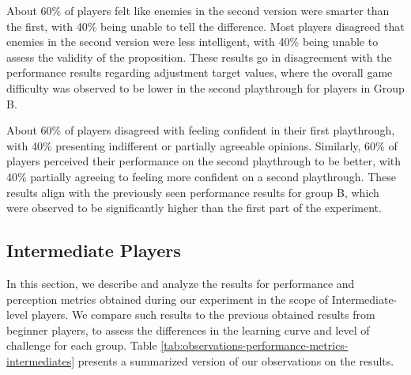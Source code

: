 About 60\% of players felt like enemies in the second version were smarter than the first, with 40\% being unable to tell the difference. Most players disagreed that enemies in the second version were less intelligent, with 40\% being unable to assess the validity of the proposition. These results go in disagreement with the performance results regarding adjustment target values, where the overall game difficulty was observed to be lower in the second playthrough for players in Group B.

About 60\% of players disagreed with feeling confident in their first playthrough, with 40\% presenting indifferent or partially agreeable opinions. Similarly, 60\% of players perceived their performance on the second playthrough to be better, with 40\% partially agreeing to feeling more confident on a second playthrough. These results align with the previously seen performance results for group B, which were observed to be significantly higher than the first part of the experiment.


\subsection{Intermediate Players}

In this section, we describe and analyze the results for performance and perception metrics obtained during our experiment in the scope of Intermediate-level players. We compare such results to the previous obtained results from beginner players, to assess the differences in the learning curve and level of challenge for each group. Table \ref{tab:observations-performance-metrics-intermediates} presents a summarized version of our observations on the results.


